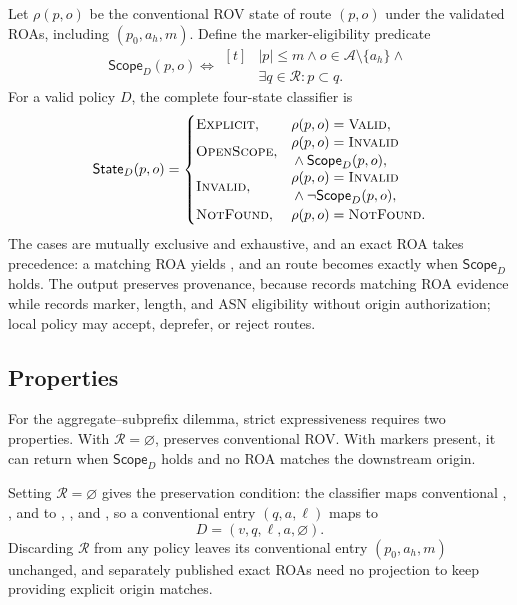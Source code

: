 Let $\rho(p,o)$ be the conventional ROV state of route $(p,o)$ under the validated ROAs, including $(p_0,a_h,m)$. Define the marker-eligibility predicate
\begin{equation}
\mathsf{Scope}_D(p,o)\iff
\begin{aligned}[t]
&|p|\leq m\land o\in\mathcal{A}\setminus\{a_h\}\land{}\\[-2pt]
&\exists q\in\mathcal{R}:p\subset q.
\end{aligned}
\end{equation}
For a valid policy $D$, the complete four-state classifier is
\begingroup
\small
\begin{equation}
\mathsf{State}_D(p,o)=
\begin{cases}
\textnormal{\textsc{Explicit}}, & \rho(p,o)=\textnormal{\textsc{Valid}},\\
\mbox{\textnormal{\textsc{OpenScope}}}, &
\begin{aligned}
&\rho(p,o)=\textnormal{\textsc{Invalid}}\\[-2pt]
&{}\land\mathsf{Scope}_D(p,o),
\end{aligned}\\
\textnormal{\textsc{Invalid}}, &
\begin{aligned}
&\rho(p,o)=\textnormal{\textsc{Invalid}}\\[-2pt]
&{}\land\neg\mathsf{Scope}_D(p,o),
\end{aligned}\\
\textnormal{\textsc{NotFound}}, & \rho(p,o)=\textnormal{\textsc{NotFound}}.
\end{cases}
\end{equation}
\endgroup
The cases are mutually exclusive and exhaustive, and an exact ROA takes precedence: a matching ROA yields \explicit{}, and an \invalid{} route becomes \openscope{} exactly when $\mathsf{Scope}_D$ holds. The output preserves provenance, because \explicit{} records matching ROA evidence while \openscope{} records marker, length, and ASN eligibility without origin authorization; local policy may accept, deprefer, or reject \openscope{} routes.

\subsection{Properties}

For the aggregate--subprefix dilemma, strict expressiveness requires two properties. With $\mathcal{R}=\varnothing$, \ssrov{} preserves conventional ROV. With markers present, it can return \openscope{} when $\mathsf{Scope}_D$ holds and no ROA matches the downstream origin.

Setting $\mathcal{R}=\varnothing$ gives the preservation condition: the classifier maps conventional \valid{}, \invalid{}, and \notfound{} to \explicit{}, \invalid{}, and \notfound{}, so a conventional entry $(q,a,\ell)$ maps to
\begin{equation}
D=(v,q,\ell,a,\varnothing).
\end{equation}
Discarding $\mathcal{R}$ from any policy leaves its conventional entry $(p_0,a_h,m)$ unchanged, and separately published exact ROAs need no projection to keep providing explicit origin matches.

